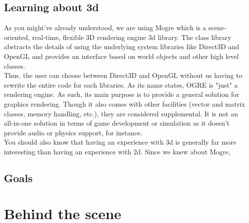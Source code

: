 \documentclass[article]{report} %
\begin{document}
						\section{Learning about 3d}
								As you might've already understood, we are using Mogre which is a scene-oriented, real-time, flexible 3D rendering engine 3d library.\newline
								The class library abstracts the details of using the underlying system libraries like Direct3D and OpenGL and provides an interface based on world objects and other high level classes.\\
								
								Thus, the user can choose between Direct3D and OpenGL without us having to rewrite the entire code for each libraries. As its name states, OGRE is "just" a rendering engine. As such, its main purpose is to provide a general solution for graphics rendering. Though it also comes with other facilities (vector and matrix classes, memory handling, etc.), they are considered supplemental. It is not an all-in-one solution in terms of game development or simulation as it doesn't provide audio or physics support, for instance.\\
								
								You should also know that having an experience with 3d is generally far more interesting than having an experience with 2d. Since we knew about Mogre, 
								
								
					
						\section{Goals}
				\chapter{Behind the scene}
\end{document}

